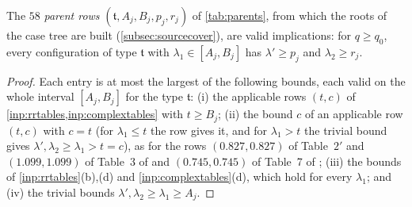 \begin{proposition}\label{prop:parentrows}
The $58$ \emph{parent rows} $(\mathfrak t,A_j,B_j,p_j,r_j)$ of \cref{tab:parents}, from which the roots of
the case tree are built (\cref{subsec:sourcecover}), are valid implications: for $q\ge q_0$, every
configuration of type $\mathfrak t$ with $\lambda_1\in[A_j,B_j]$ has $\lambda'\ge p_j$ and $\lambda_2\ge r_j$.
\end{proposition}

\begin{proof}
Each entry is at most the largest of the following bounds, each valid on the whole interval $[A_j,B_j]$ for
the type $\mathfrak t$: (i) the applicable rows $(t,c)$ of \cref{inp:rrtables,inp:complextables} with $t\ge B_j$; (ii) the
bound $c$ of an applicable row $(t,c)$ with $c=t$ (for $\lambda_1\le t$ the row gives it, and for
$\lambda_1>t$ the trivial bound gives $\lambda',\lambda_2\ge\lambda_1>t=c$), as for the rows
$(0.827,0.827)$ of Table~$2'$ and $(1.099,1.099)$ of Table~3 of \cite{Xylouris2011nullstellen} and $(0.745,0.745)$
of Table~7 of \cite{HeathBrown1992zero}; (iii) the bounds of \cref{inp:rrtables}(b),(d) and
\cref{inp:complextables}(d), which hold for every $\lambda_1$; and (iv) the trivial bounds
$\lambda',\lambda_2\ge\lambda_1\ge A_j$.
\end{proof}

